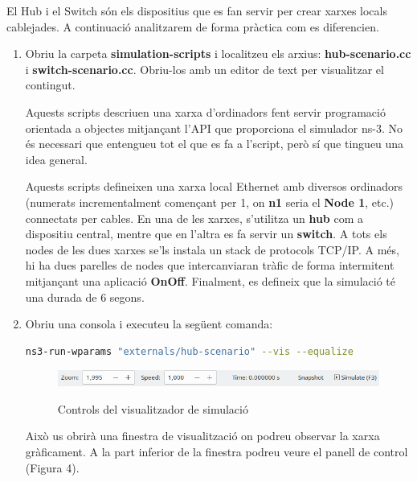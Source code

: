 \documentclass[12pt,a4paper]{article}
\begin{document}
El Hub i el Switch són els dispositius que es fan servir per crear xarxes locals cablejades. A continuació analitzarem de forma pràctica com es diferencien.
\begin{enumerate}
\item Obriu la carpeta \textbf{simulation-scripts} i localitzeu els arxius: \textbf{hub-scenario.cc} i \textbf{switch-scenario.cc}. Obriu-los amb un editor de text per visualitzar el contingut.

Aquests scripts descriuen una xarxa d'ordinadors fent servir programació orientada a objectes mitjançant l'API que proporciona el simulador ns-3. No és necessari que entengueu tot el que es fa a l'script, però sí que tingueu una idea general.

Aquests scripts defineixen una xarxa local Ethernet amb diversos ordinadors (numerats incrementalment començant per 1, on \textbf{n1} seria el \textbf{Node 1}, etc.) connectats per cables. En una de les xarxes, s'utilitza un  \textbf{hub} com a dispositiu central, mentre que en l'altra es fa servir un  \textbf{switch}. A tots els nodes de les dues xarxes se'ls instala un stack de protocols TCP/IP. A més, hi ha dues parelles de nodes que intercanviaran tràfic de forma intermitent mitjançant una aplicació \textbf{OnOff}. Finalment, es defineix que la simulació té una durada de 6 segons.
\item Obriu una consola i executeu la següent comanda:
\begin{lstlisting}[language=bash,basicstyle=\footnotesize]
ns3-run-wparams "externals/hub-scenario" --vis --equalize
\end{lstlisting}

\begin{figure}[!ht]

  \begin{center}
  \label{simulator}
    \includegraphics[width=1\textwidth]{simulator}
    \caption{Controls del visualitzador de simulació}
  \end{center}
\end{figure}
Això us obrirà una finestra de visualització on podreu observar la xarxa gràficament. A la part inferior de la finestra podreu veure el panell de control (Figura 4).


\end{enumerate}
\end{document}
